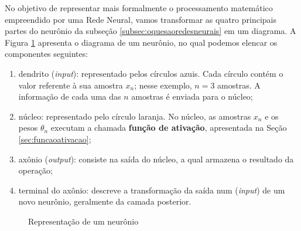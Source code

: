 No objetivo de representar mais formalmente o processamento matemático empreendido por uma Rede Neural, vamos transformar as quatro principais partes do neurônio da subseção \ref{subsec:oquesaoredesneurais} em um diagrama. A Figura \ref{fg:rede_neural_simples} apresenta o diagrama de um neurônio, no qual podemos elencar os componentes seguintes:
\begin{enumerate}
 \item dendrito (\textit{input}): representado pelos círculos azuis. Cada círculo contém o valor referente à sua amostra $x_n$; nesse exemplo, $n = 3$ amostras. A informação de cada uma das $n$ amostras é enviada para o núcleo;
    \item núcleo: representado pelo círculo laranja. No núcleo, as amostras $x_n$ e os pesos $\theta_n$ executam a chamada \textbf{função de ativação}, apresentada na Seção \ref{sec:funcaoativacao};
   
    \item axônio (\textit{output}): consiste na saída do núcleo, a qual armazena o resultado da operação;
    \item terminal do axônio: descreve a transformação da saída num (\textit{input}) de um novo neurônio, geralmente da camada posterior.
    
\end{enumerate}


\begin{figure}
\centering
\caption{Representação de um neurônio}
\large
{}
\label{fg:rede_neural_simples}
\end{figure}

